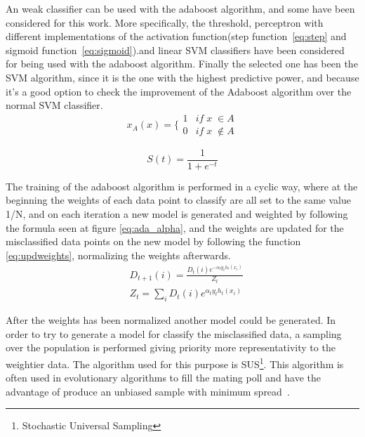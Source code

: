 \documentclass[10pt, journal]{IEEEtran}
\begin{document}
An weak classifier can be used with the adaboost algorithm, and some have been considered for this work. More specifically, the threshold, perceptron with different implementations of the activation function(step function~\ref{eq:step} and sigmoid function~\ref{eq:sigmoid}).and linear SVM classifiers have been considered for being used with the adaboost algorithm. Finally the selected one has been the SVM algorithm, since it is the one with the highest predictive power, and because it’s a good option to check the improvement of the Adaboost algorithm over the normal SVM classifier.\\

\begin{equation}
	x_{A}( x )=\{\begin{array}{cc} 1 & if\; x\; \in A \\ 0 & if\; x\; \notin A \end{array}
	\label{eq:step}
\end{equation}

\begin{equation}
	S(t) = \frac{1}{1+e^{-t}}
	\label{eq:sigmoid}
\end{equation}

The training of the adaboost algorithm is performed in a cyclic way, where at the beginning the weights of each data point to classify are all set to the same value 1/N, and on each iteration a new model is generated and weighted by following the formula seen at figure \ref{eq:ada_alpha}, and the weights are updated for the misclassified data points on the new model by following the function \ref{eq:updweights}, normalizing the weights afterwards.\\

\begin{equation}
	\begin{aligned}
	&D_{t+1}(i) = \frac{D_t(i)e^{-\alpha_ty_th_t(x_i)}}{Z_t}\\
	&Z_t = \sum_{i}{D_t(i)e^{\alpha_ty_th_t(x_i)}}
	\end{aligned}
	\label{eq:updweights}
\end{equation}

After the weights has been normalized another model could be generated. In order to try to generate a model for classify the misclassified data, a sampling over the population is performed giving priority more representativity to the weightier data. The algorithm used for this purpose is SUS\footnote{Stochastic Universal Sampling}. This algorithm is often used in evolutionary algorithms to fill the mating poll and have the advantage of produce an unbiased sample with minimum spread~\cite{baker1985reducing}.\\
\end{document}
